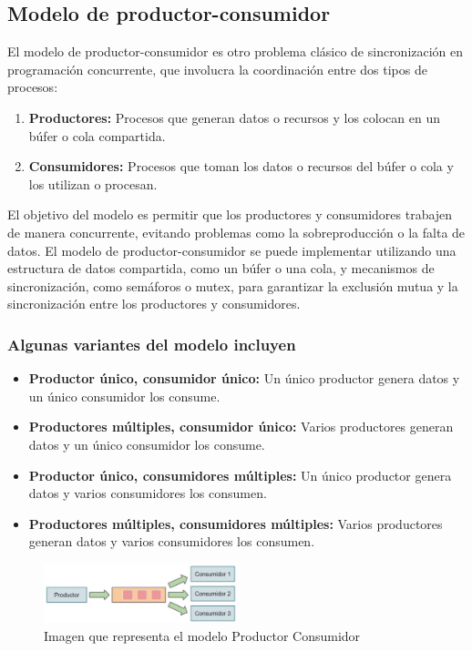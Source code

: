 \documentclass[12pt,a4paper]{article}
\begin{document}
\subsection{Modelo de productor-consumidor}
El modelo de productor-consumidor es otro problema clásico de sincronización en programación concurrente, que involucra la coordinación entre dos tipos de procesos:
\begin{enumerate}
    \item \textbf{Productores:} Procesos que generan datos o recursos y los colocan en un búfer o cola compartida.
    \item \textbf{Consumidores:} Procesos que toman los datos o recursos del búfer o cola y los utilizan o procesan.
    
\end{enumerate}

El objetivo del modelo es permitir que los productores y consumidores trabajen de manera concurrente, evitando problemas como la sobreproducción o la falta de datos.
\cite{productor}
\espacio
El modelo de productor-consumidor se puede implementar utilizando una estructura de datos compartida, como un búfer o una cola, y mecanismos de sincronización, como semáforos o mutex, para garantizar la exclusión mutua y la sincronización entre los productores y consumidores.

\subsubsection*{Algunas variantes del modelo incluyen}
\begin{itemize}
    \item \textbf{Productor único, consumidor único:} Un único productor genera datos y un único consumidor los consume.
    \item \textbf{Productores múltiples, consumidor único:} Varios productores generan datos y un único consumidor los consume.
    \item \textbf{Productor único, consumidores múltiples:} Un único productor genera datos y varios consumidores los consumen.
    \item \textbf{Productores múltiples, consumidores múltiples:} Varios productores generan datos y varios consumidores los consumen.
    
\end{itemize}

\begin{figure}[htb!]
    \centering
    \caption{Imagen que representa el modelo Productor Consumidor } 
    \includegraphics[width=0.5\textwidth]{images/productor.png}
    
\end{figure}
\end{document}
